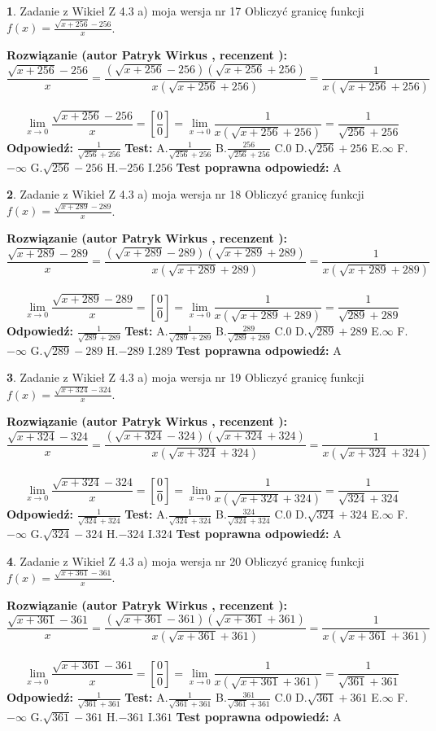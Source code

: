 \documentclass[12pt, a4paper]{article}
\theoremstyle{definition} %
\newtheorem{zad}{}
\newcommand{\zadStart}[1]{\begin{zad}#1\newline}
\newcommand{\zadStop}{\end{zad}}
\newcommand{\rozwStart}[2]{\noindent \textbf{Rozwiązanie (autor #1 , recenzent #2): }\newline}
\newcommand{\rozwStop}{\newline}
\newcommand{\odpStart}{\noindent \textbf{Odpowiedź:}\newline}
\newcommand{\odpStop}{\newline}
\newcommand{\testStart}{\noindent \textbf{Test:}\newline}
\newcommand{\testStop}{\newline}
\newcommand{\kluczStart}{\noindent \textbf{Test poprawna odpowiedź:}\newline}
\newcommand{\kluczStop}{\newline}
\begin{document}
\zadStart{Zadanie z Wikieł Z 4.3 a) moja wersja nr 17}
Obliczyć granicę funkcji $f(x)=\frac{\sqrt{x+256}-256}{x}$.
\zadStop
\rozwStart{Patryk Wirkus}{}
$$\frac{\sqrt{x+256}-256}{x}=\frac{(\sqrt{x+256}-256)(\sqrt{x+256}+256)}{x(\sqrt{x+256}+256)}=\frac{1}{x(\sqrt{x+256}+256)}$$
\\
$$\lim\limits_{x\to0}\frac{\sqrt{x+256}-256}{x}=[\frac{0}{0}]=
\lim\limits_{x\to0}\frac{1}{x(\sqrt{x+256}+256)} = \frac{1}{\sqrt{256}+256}$$
\rozwStop
\odpStart
$\frac{1}{\sqrt{256}+256}$
\odpStop
\testStart
A.$\frac{1}{\sqrt{256}+256}$
B.$\frac{256}{\sqrt{256}+256}$
C.$0$
D.$\sqrt{256}+256$
E.$\infty$
F.$-\infty$
G.$\sqrt{256}-256$
H.$-256$
I.$256$
\testStop
\kluczStart
A
\kluczStop



\zadStart{Zadanie z Wikieł Z 4.3 a) moja wersja nr 18}
Obliczyć granicę funkcji $f(x)=\frac{\sqrt{x+289}-289}{x}$.
\zadStop
\rozwStart{Patryk Wirkus}{}
$$\frac{\sqrt{x+289}-289}{x}=\frac{(\sqrt{x+289}-289)(\sqrt{x+289}+289)}{x(\sqrt{x+289}+289)}=\frac{1}{x(\sqrt{x+289}+289)}$$
\\
$$\lim\limits_{x\to0}\frac{\sqrt{x+289}-289}{x}=[\frac{0}{0}]=
\lim\limits_{x\to0}\frac{1}{x(\sqrt{x+289}+289)} = \frac{1}{\sqrt{289}+289}$$
\rozwStop
\odpStart
$\frac{1}{\sqrt{289}+289}$
\odpStop
\testStart
A.$\frac{1}{\sqrt{289}+289}$
B.$\frac{289}{\sqrt{289}+289}$
C.$0$
D.$\sqrt{289}+289$
E.$\infty$
F.$-\infty$
G.$\sqrt{289}-289$
H.$-289$
I.$289$
\testStop
\kluczStart
A
\kluczStop



\zadStart{Zadanie z Wikieł Z 4.3 a) moja wersja nr 19}
Obliczyć granicę funkcji $f(x)=\frac{\sqrt{x+324}-324}{x}$.
\zadStop
\rozwStart{Patryk Wirkus}{}
$$\frac{\sqrt{x+324}-324}{x}=\frac{(\sqrt{x+324}-324)(\sqrt{x+324}+324)}{x(\sqrt{x+324}+324)}=\frac{1}{x(\sqrt{x+324}+324)}$$
\\
$$\lim\limits_{x\to0}\frac{\sqrt{x+324}-324}{x}=[\frac{0}{0}]=
\lim\limits_{x\to0}\frac{1}{x(\sqrt{x+324}+324)} = \frac{1}{\sqrt{324}+324}$$
\rozwStop
\odpStart
$\frac{1}{\sqrt{324}+324}$
\odpStop
\testStart
A.$\frac{1}{\sqrt{324}+324}$
B.$\frac{324}{\sqrt{324}+324}$
C.$0$
D.$\sqrt{324}+324$
E.$\infty$
F.$-\infty$
G.$\sqrt{324}-324$
H.$-324$
I.$324$
\testStop
\kluczStart
A
\kluczStop



\zadStart{Zadanie z Wikieł Z 4.3 a) moja wersja nr 20}
Obliczyć granicę funkcji $f(x)=\frac{\sqrt{x+361}-361}{x}$.
\zadStop
\rozwStart{Patryk Wirkus}{}
$$\frac{\sqrt{x+361}-361}{x}=\frac{(\sqrt{x+361}-361)(\sqrt{x+361}+361)}{x(\sqrt{x+361}+361)}=\frac{1}{x(\sqrt{x+361}+361)}$$
\\
$$\lim\limits_{x\to0}\frac{\sqrt{x+361}-361}{x}=[\frac{0}{0}]=
\lim\limits_{x\to0}\frac{1}{x(\sqrt{x+361}+361)} = \frac{1}{\sqrt{361}+361}$$
\rozwStop
\odpStart
$\frac{1}{\sqrt{361}+361}$
\odpStop
\testStart
A.$\frac{1}{\sqrt{361}+361}$
B.$\frac{361}{\sqrt{361}+361}$
C.$0$
D.$\sqrt{361}+361$
E.$\infty$
F.$-\infty$
G.$\sqrt{361}-361$
H.$-361$
I.$361$
\testStop
\kluczStart
A
\kluczStop
\end{document}
